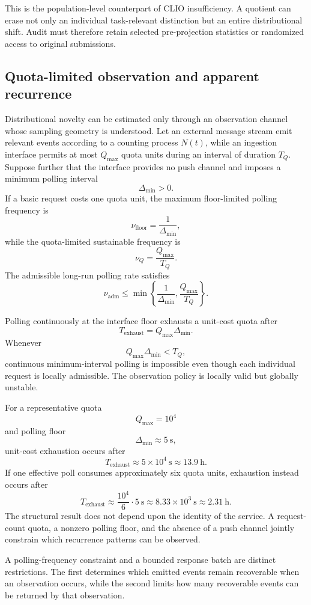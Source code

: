 \documentclass[11pt]{article}
\theoremstyle{definition}
\begin{document}
This is the population-level counterpart of CLIO insufficiency. A quotient can erase not only an individual task-relevant distinction but an entire distributional shift. Audit must therefore retain selected pre-projection statistics or randomized access to original submissions.

\subsection{Quota-limited observation and apparent recurrence}

Distributional novelty can be estimated only through an observation channel whose sampling geometry is understood. Let an external message stream emit relevant events according to a counting process \(N(t)\), while an ingestion interface permits at most \(Q_{\max}\) quota units during an interval of duration \(T_Q\). Suppose further that the interface provides no push channel and imposes a minimum polling interval
\[
\Delta_{\min}>0.
\]
If a basic request costs one quota unit, the maximum floor-limited polling frequency is
\[
\nu_{\mathrm{floor}}
=
\frac{1}{\Delta_{\min}},
\]
while the quota-limited sustainable frequency is
\[
\nu_Q
=
\frac{Q_{\max}}{T_Q}.
\]
The admissible long-run polling rate satisfies
\[
\nu_{\mathrm{adm}}
\leq
\min\left\{
\frac{1}{\Delta_{\min}},
\frac{Q_{\max}}{T_Q}
\right\}.
\]

Polling continuously at the interface floor exhausts a unit-cost quota after
\[
T_{\mathrm{exhaust}}
=
Q_{\max}\Delta_{\min}.
\]
Whenever
\[
Q_{\max}\Delta_{\min}<T_Q,
\]
continuous minimum-interval polling is impossible even though each individual request is locally admissible. The observation policy is locally valid but globally unstable.

For a representative quota
\[
Q_{\max}=10^4
\]
and polling floor
\[
\Delta_{\min}\approx5\ \mathrm{s},
\]
unit-cost exhaustion occurs after
\[
T_{\mathrm{exhaust}}
\approx
5\times10^4\ \mathrm{s}
\approx
13.9\ \mathrm{h}.
\]
If one effective poll consumes approximately six quota units, exhaustion instead occurs after
\[
T_{\mathrm{exhaust}}
\approx
\frac{10^4}{6}\cdot5\ \mathrm{s}
\approx
8.33\times10^3\ \mathrm{s}
\approx
2.31\ \mathrm{h}.
\]
The structural result does not depend upon the identity of the service. A request-count quota, a nonzero polling floor, and the absence of a push channel jointly constrain which recurrence patterns can be observed.

A polling-frequency constraint and a bounded response batch are distinct restrictions. The first determines which emitted events remain recoverable when an observation occurs, while the second limits how many recoverable events can be returned by that observation.
\end{document}
